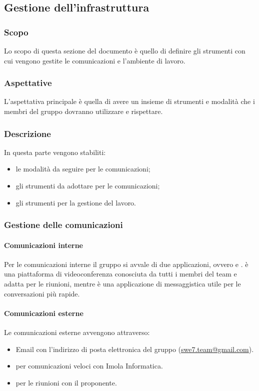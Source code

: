 \subsection{Gestione dell'infrastruttura}
\subsubsection{Scopo}
Lo scopo di questa sezione del documento è quello di definire gli strumenti con cui vengono gestite le 
comunicazioni e l'ambiente di lavoro.

\subsubsection{Aspettative}
L'aspettativa principale è quella di avere un insieme di strumenti e modalità che i membri del gruppo 
dovranno utilizzare e rispettare.

\subsubsection{Descrizione}
In questa parte vengono stabiliti:
\begin{itemize}
    \item le modalità da seguire per le comunicazioni;
    \item gli strumenti da adottare per le comunicazioni;
    \item gli strumenti per la gestione del lavoro.
\end{itemize}

\subsubsection{Gestione delle comunicazioni} 
\paragraph{Comunicazioni interne} \hfill \break
Per le comunicazioni interne il gruppo si avvale di due applicazioni, ovvero  e 
.  è una piattaforma di videoconferenza conosciuta da tutti i membri del 
team e adatta per le riunioni, mentre  è una applicazione di messaggistica utile per le 
conversazioni più rapide.

\paragraph{Comunicazioni esterne} \hfill \break
Le comunicazioni esterne avvengono attraverso:
\begin{itemize}
    \item Email con l'indirizzo di posta elettronica del gruppo 
        (\href{mailto:swe7.team@gmail.com}{swe7.team@gmail.com}).
    \item {} per comunicazioni veloci con Imola Informatica.
    \item {} per le riunioni con il proponente.
\end{itemize}

